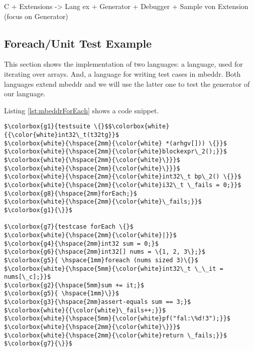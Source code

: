 C + Extensions 
	    -> Lang ex +  Generator + Debugger
		+ Sample von Extension (focus on Generator)
		
\subsection{Foreach/Unit Test Example}

This section shows the implementation of two languages: a  language,
used for iterating over arrays. And, a  language for writing test
cases in mbeddr. Both languages extend mbeddr and we will use the
latter one to test the generator of our  language.

Listing \ref{lst:mbeddrForEach} shows a code snippet.

\noindent 
\begin{minipage}[t]{120pt} 
\begin{lstlisting}[language=mbeddr]
$\colorbox{g1}{testsuite \{}$$\colorbox{white}{{\color{white}int32\_t(t32tg}}$
$\colorbox{white}{\hspace{2mm}{\color{white} *(arhgv[])) \{}}$
$\colorbox{white}{\hspace{2mm}{\color{white}blockexpr\_2();}}$
$\colorbox{white}{\hspace{2mm}{\color{white}\}}}$
$\colorbox{white}{\hspace{2mm}{\color{white}\}}}$
$\colorbox{white}{\hspace{2mm}{\color{white}int32\_t bp\_2() \{}}$ 
$\colorbox{white}{\hspace{2mm}{\color{white}i32\_t \_fails = 0;}}$
$\colorbox{g8}{\hspace{2mm}forEach;}$
$\colorbox{white}{\hspace{2mm}{\color{white}\_fails;}}$
$\colorbox{g1}{\}}$

$\colorbox{g7}{testcase forEach \{}$ 
$\colorbox{white}{\hspace{2mm}{\color{white}|}}$
$\colorbox{g4}{\hspace{2mm}int32 sum = 0;}$
$\colorbox{g6}{\hspace{2mm}int32[] nums = \{1, 2, 3\};}$
$\colorbox{g5}{	\hspace{1mm}foreach (nums sized 3)\{}$
$\colorbox{white}{\hspace{5mm}{\color{white}int32\_t \_\_it = nums[\_c];}}$
$\colorbox{g2}{\hspace{5mm}sum += it;}$
$\colorbox{g5}{	\hspace{1mm}\}}$
$\colorbox{g3}{\hspace{2mm}assert-equals sum == 3;}$
$\colorbox{white}{{\color{white}\_fails++;}}$
$\colorbox{white}{\hspace{5mm}{\color{white}pf("fal:\%d!3");}}$
$\colorbox{white}{\hspace{2mm}{\color{white}\}}}$
$\colorbox{white}{\hspace{2mm}{\color{white}return \_fails;}}$
$\colorbox{g7}{\}}$
\end{lstlisting}
\end{minipage} 
